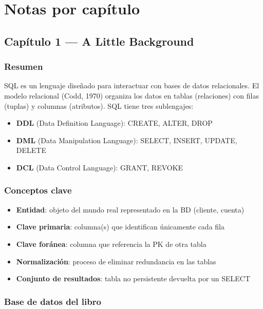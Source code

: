 \section{Notas por capítulo}\label{notas-por-capuxedtulo-1}

\subsection{Capítulo 1 --- A Little Background}\label{capuxedtulo-1-a-little-background}

\subsubsection{Resumen}\label{resumen-1}

SQL es un lenguaje diseñado para interactuar con bases de datos relacionales. El modelo relacional (Codd, 1970) organiza los datos en tablas (relaciones) con filas (tuplas) y columnas (atributos). SQL tiene tres sublengajes:

\begin{itemize}
\tightlist
\item
  \textbf{DDL} (Data Definition Language): CREATE, ALTER, DROP
\item
  \textbf{DML} (Data Manipulation Language): SELECT, INSERT, UPDATE, DELETE
\item
  \textbf{DCL} (Data Control Language): GRANT, REVOKE
\end{itemize}

\subsubsection{Conceptos clave}\label{conceptos-clave-1}

\begin{itemize}
\tightlist
\item
  \textbf{Entidad}: objeto del mundo real representado en la BD (cliente, cuenta)
\item
  \textbf{Clave primaria}: columna(s) que identifican únicamente cada fila
\item
  \textbf{Clave foránea}: columna que referencia la PK de otra tabla
\item
  \textbf{Normalización}: proceso de eliminar redundancia en las tablas
\item
  \textbf{Conjunto de resultados}: tabla no persistente devuelta por un SELECT
\end{itemize}

\subsubsection{Base de datos del libro}\label{base-de-datos-del-libro}

